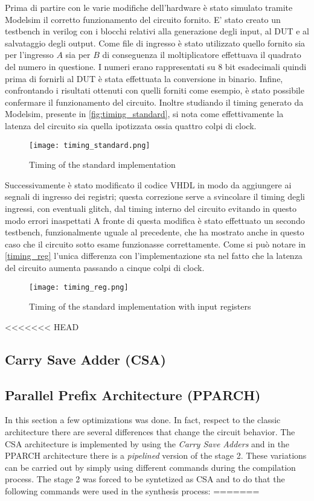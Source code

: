 Prima di partire con le varie modifiche dell'hardware è stato simulato tramite Modelsim il corretto funzionamento del circuito fornito. E' stato creato un testbench in verilog con i blocchi relativi alla generazione degli input, al DUT e al salvataggio degli output.
Come file di ingresso è stato utilizzato quello fornito sia per l'ingresso $A$ sia per $B$ di conseguenza il moltiplicatore effettuava il quadrato del numero in questione. I numeri erano rappresentati su 8 bit esadecimali quindi prima di fornirli al DUT è stata effettuata la conversione in binario.
Infine, confrontando i risultati ottenuti con quelli forniti come esempio, è stato possibile confermare il funzionamento del circuito. Inoltre studiando il timing generato da Modelsim, presente in \autoref{fig:timing_standard}, si nota come effettivamente la latenza del circuito sia quella ipotizzata ossia quattro colpi di clock.

\begin{figure}[h]
	\center
	\texttt{[image: timing\_standard.png]}
	\caption{Timing of the standard implementation}
	\label{fig:timing_standard}
\end{figure}

Successivamente è stato modificato il codice VHDL in modo da aggiungere ai segnali di ingresso dei registri; questa correzione serve a svincolare il timing degli ingressi, con eventuali glitch, dal timing interno del circuito evitando in questo modo errori inaspettati
A fronte di questa modifica è stato effettuato un secondo testbench, funzionalmente uguale al precedente, che ha mostrato anche in questo caso che il circuito sotto esame funzionasse correttamente. Come si può notare in \autoref{timing_reg} l'unica differenza con l'implementazione sta nel fatto che la latenza del circuito aumenta passando a cinque colpi di clock.

\begin{figure}[h]
	\center
	\texttt{[image: timing\_reg.png]}
	\caption{Timing of the standard implementation with input registers}
	\label{fig:timing_reg}
\end{figure}


<<<<<<< HEAD
\subsection{Carry Save Adder (CSA)}
\subsection{Parallel Prefix Architecture (PPARCH)}
In this section a few optimizations was done. In fact, respect to the classic architecture there are several differences that change the circuit behavior. The CSA architecture is implemented by using the \textit{Carry Save Adders} and in the PPARCH architecture there is a \textit{pipelined} version of the stage 2. These variations can be carried out by simply using different commands during the compilation process. The stage 2 was forced to be syntetized as CSA and to do that the following commands were used in the synthesis process:
=======
